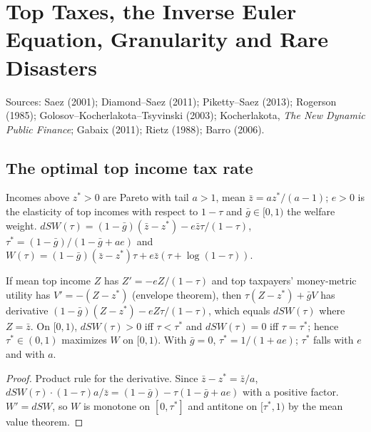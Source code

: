 \chapter{Top Taxes, the Inverse Euler Equation, Granularity and Rare Disasters}
\label{chap:public_finance_risk}

Sources: Saez (2001); Diamond--Saez (2011); Piketty--Saez (2013); Rogerson (1985); Golosov--Kocherlakota--Tsyvinski (2003);
Kocherlakota, \emph{The New Dynamic Public Finance}; Gabaix (2011); Rietz (1988); Barro (2006).

\section{The optimal top income tax rate}

\begin{definition}
\label{def:saez}
\leanok
Incomes above $z^*>0$ are Pareto with tail $a>1$, mean $\bar z=az^*/(a-1)$; $e>0$ is the elasticity of top incomes with respect
to $1-\tau$ and $\bar g\in[0,1)$ the welfare weight. $dSW(\tau)=(1-\bar g)(\bar z-z^*)-e\bar z\tau/(1-\tau)$,
$\tau^*=(1-\bar g)/(1-\bar g+ae)$ and $W(\tau)=(1-\bar g)(\bar z-z^*)\tau+e\bar z(\tau+\log(1-\tau))$.
\end{definition}

\begin{theorem}
\label{thm:saez}
\leanok
{}
If mean top income $Z$ has $Z'=-eZ/(1-\tau)$ and top taxpayers' money-metric utility has $V'=-(Z-z^*)$ (envelope theorem),
then $\tau(Z-z^*)+\bar gV$ has derivative $(1-\bar g)(Z-z^*)-eZ\tau/(1-\tau)$, which equals $dSW(\tau)$ where $Z=\bar z$.
On $[0,1)$, $dSW(\tau)>0$ iff $\tau<\tau^*$ and $dSW(\tau)=0$ iff $\tau=\tau^*$; hence $\tau^*\in(0,1)$ maximizes $W$ on
$[0,1)$. With $\bar g=0$, $\tau^*=1/(1+ae)$; $\tau^*$ falls with $e$ and with $a$.
\end{theorem}
\begin{proof}
\leanok
Product rule for the derivative. Since $\bar z-z^*=\bar z/a$, $dSW(\tau)\cdot(1-\tau)a/\bar z=(1-\bar g)-\tau(1-\bar g+ae)$ with
a positive factor. $W'=dSW$, so $W$ is monotone on $[0,\tau^*]$ and antitone on $[\tau^*,1)$ by the mean value theorem.
\end{proof}

